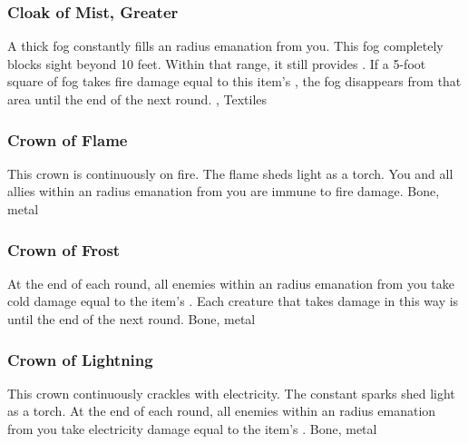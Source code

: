 \lowercase{\hypertarget{item:Cloak of Mist, Greater}{}}\label{item:Cloak of Mist, Greater}
\hypertarget{item:Cloak of Mist, Greater}{\subsubsection{Cloak of Mist, Greater\hfill{}}}
A thick fog constantly fills an \areamed radius emanation from you.
This fog completely blocks sight beyond 10 feet.
Within that range, it still provides \concealment.
If a 5-foot square of fog takes fire damage equal to this item's , the fog disappears from that area until the end of the next round.
 , 
 Textiles
\lowercase{\hypertarget{item:Crown of Flame}{}}\label{item:Crown of Flame}
\hypertarget{item:Crown of Flame}{\subsubsection{Crown of Flame\hfill{}}}
This crown is continuously on fire.
The flame sheds light as a torch.
You and all allies within an \arealarge radius emanation from you are immune to fire damage.
 
 Bone, metal
\lowercase{\hypertarget{item:Crown of Frost}{}}\label{item:Crown of Frost}
\hypertarget{item:Crown of Frost}{\subsubsection{Crown of Frost\hfill{}}}
At the end of each round, all enemies within an \areamed radius emanation from you take cold damage equal to the item's .
Each creature that takes damage in this way is \fatigued until the end of the next round.
 
 Bone, metal
\lowercase{\hypertarget{item:Crown of Lightning}{}}\label{item:Crown of Lightning}
\hypertarget{item:Crown of Lightning}{\subsubsection{Crown of Lightning\hfill{}}}
This crown continuously crackles with electricity.
The constant sparks shed light as a torch.
At the end of each round, all enemies within an \areamed radius emanation from you take electricity damage equal to the item's .
 
 Bone, metal
\lowercase{\hypertarget{item:Crown of Thunder}{}}\label{item:Crown of Thunder}
